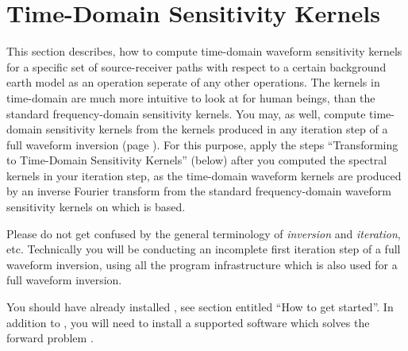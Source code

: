 \section{Time-Domain Sensitivity Kernels} \label{guide,sec:time_kernels}
%
%
This section describes, how to compute time-domain waveform sensitivity kernels for a specific set 
of source-receiver paths with respect to a certain background earth model as an operation seperate of any
other \ASKI{} operations. The kernels in time-domain are much more intuitive to look at for human beings, 
than the standard frequency-domain sensitivity kernels. You may, as well, compute time-domain sensitivity 
kernels from the kernels produced in any iteration step of a full waveform inversion 
(page \pageref{guide,sec:classic_inversion}). For this purpose, apply the steps 
``Transforming to Time-Domain Sensitivity Kernels'' (below) after you computed the spectral kernels in 
your iteration step, as the time-domain waveform kernels are produced by an inverse Fourier transform 
from the standard frequency-domain waveform sensitivity kernels on which \ASKI{} is based.

Please do not get confused by the general terminology of \emph{inversion} and \emph{iteration}, etc. 
Technically you will be conducting an incomplete first iteration step of a full waveform inversion, 
using all the program infrastructure which is also used for a full waveform inversion. 

You should have already installed \ASKI{}, see section entitled ``How to get started''. 
In addition to \ASKI{}, you will need to install a supported software which 
solves the forward problem .
%
